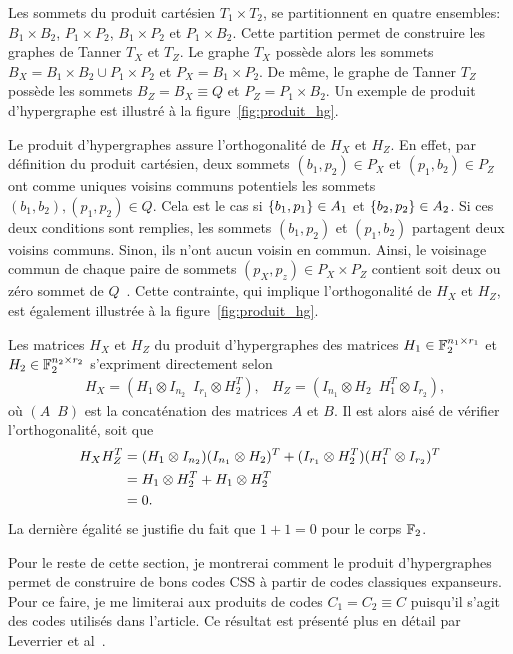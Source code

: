 Les sommets du produit cartésien $T_1 \times T_2$, 
se partitionnent en quatre ensembles:
$B_1 \times B_2$, $P_1 \times P_2$, $B_1 \times P_2$ et $P_1 \times B_2$.
Cette partition permet de construire les graphes de Tanner $T_X$ et $T_Z$.
Le graphe $T_X$ possède alors les sommets $B_X = B_1 \times B_2 \cup P_1 \times P_2$
et $P_X = B_1 \times P_2$.
De même,
le graphe de Tanner $T_Z$ possède les sommets $B_Z = B_X \equiv Q$
et $P_Z = P_1 \times B_2$.
Un exemple de produit d'hypergraphe est illustré à la figure~\ref{fig:produit_hg}.

Le produit d'hypergraphes assure l'orthogonalité de $H_X$ et $H_Z$.
En effet,
par définition du produit cartésien,
deux sommets $(b_1, p_2) \in P_X$ et $(p_1, b_2) \in P_Z$ 
ont comme uniques voisins communs potentiels les sommets $(b_1, b_2), (p_1, p_2) \in Q$.
Cela est le cas si $\qty{b_1, p_1} \in A_1$ et $\qty{b_2, p_2} \in A_2$.
Si ces deux conditions sont remplies,
les sommets $(b_1, p_2)$ et $(p_1, b_2)$ partagent deux voisins communs.
Sinon,
ils n'ont aucun voisin en commun.
Ainsi, le voisinage commun de chaque paire de sommets $(p_X, p_z) \in P_X \times P_Z$
contient soit deux ou zéro sommet de $Q$~\cite{tillich_quantum_2014}.
Cette contrainte,
qui implique l'orthogonalité de $H_X$ et $H_Z$,
est également illustrée à la figure~\ref{fig:produit_hg}.

Les matrices $H_X$ et $H_Z$ du produit d'hypergraphes des matrices
$H_1 \in \mathbb{F}_{2}^{n_1 \times r_1}$
et
$H_2 \in \mathbb{F}_{2}^{n_2 \times r_2}$
s'expriment directement selon~\cite{tillich_quantum_2014}
\begin{align}
	&H_X = (H_1 \otimes I_{n_2}\, \, \, I_{r_1} \otimes H_2^T),
	&H_Z = (I_{n_1} \otimes H_2 \, \, \, H_1^T \otimes I_{r_2}),
	\label{eq:prod_hg_mat}
\end{align}
où $(A \, \, \, B)$ est la concaténation des matrices $A$ et $B$.
Il est alors aisé de vérifier l'orthogonalité,
soit que
\begin{align}
	H_X H_Z^T 
	&=
	(H_1 \otimes I_{n_2})(I_{n_1} \otimes H_2)^T 
	+ (I_{r_1} \otimes H_2^T)(H_1^T \otimes I_{r_2})^T
	\notag \\
	&= 
	H_1 \otimes H_2^T + H_1 \otimes H_2^T
	\notag \\
	&= 0.
\end{align}
La dernière égalité se justifie du fait que $1 + 1 = 0$ pour le corps $\mathbb{F}_{2}$.

Pour le reste de cette section,
je montrerai comment le produit d'hypergraphes permet de construire de bons codes CSS
à partir de codes classiques expanseurs.
Pour ce faire,
je me limiterai aux produits de codes $C_1 = C_2 \equiv C$ 
puisqu'il s'agit des codes utilisés dans l'article.
Ce résultat est présenté plus en détail par Leverrier et al~\cite{leverrier_quantum_2015}.

